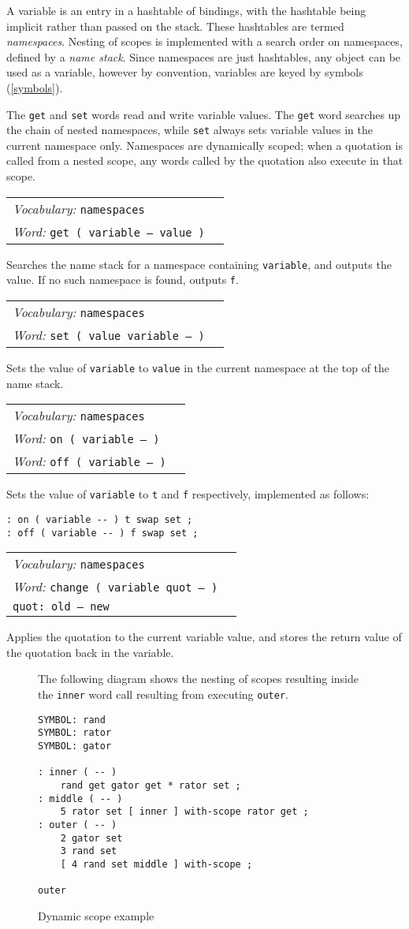\documentclass{book}
\newcommand{\vocabulary}[1]{\emph{Vocabulary:} \texttt{#1}&\\}
\newcommand{\ordinaryword}[2]{\index{\texttt{#1}}\emph{Word:} \texttt{#2}&\\}
\newcommand{\wordtable}[1]{


\begin{tabularx}{12cm}{lX}
\hline
#1
\hline
\end{tabularx}

}
\begin{document}
A variable is an entry in a hashtable of bindings, with the hashtable being implicit rather than passed on the stack. These hashtables are termed \emph{namespaces}. Nesting of scopes is implemented with a search order on namespaces, defined by a \emph{name stack}. Since namespaces are just hashtables, any object can be used as a variable, however by convention, variables are keyed by symbols (\ref{symbols}). 

The \texttt{get} and \texttt{set} words read and write variable values. The \texttt{get} word searches up the chain of nested namespaces, while \texttt{set} always sets variable values in the current namespace only. Namespaces are dynamically scoped; when a quotation is called from a nested scope, any words called by the quotation also execute in that scope.

\wordtable{
\vocabulary{namespaces}
\ordinaryword{get}{get ( variable -- value )}

}
Searches the name stack for a namespace containing \texttt{variable}, and outputs the value. If no such namespace is found, outputs \texttt{f}.
\wordtable{
\vocabulary{namespaces}
\ordinaryword{set}{set ( value variable -- )}
}
Sets the value of \texttt{variable} to \texttt{value} in the current namespace at the top of the name stack.
\wordtable{
\vocabulary{namespaces}
\ordinaryword{on}{on ( variable -- )}
\ordinaryword{off}{off ( variable -- )}
}
Sets the value of \texttt{variable} to \texttt{t} and \texttt{f} respectively, implemented as follows:
\begin{verbatim}
: on ( variable -- ) t swap set ;
: off ( variable -- ) f swap set ;
\end{verbatim}
\wordtable{
\vocabulary{namespaces}
\ordinaryword{change}{change ( variable quot -- )}
\texttt{quot:~old -- new}\\
}
Applies the quotation to the current variable value, and stores the return value of the quotation back in the variable.
\begin{figure}
\caption{Dynamic scope example}
The following diagram shows the nesting of scopes resulting inside the \texttt{inner} word call resulting from executing \texttt{outer}.
\begin{verbatim}
SYMBOL: rand
SYMBOL: rator
SYMBOL: gator

: inner ( -- )
    rand get gator get * rator set ;
: middle ( -- )
    5 rator set [ inner ] with-scope rator get ;
: outer ( -- )
    2 gator set
    3 rand set
    [ 4 rand set middle ] with-scope ;

outer
\end{verbatim}
\begin{center}
\end{center}
\end{figure}
\end{document}
